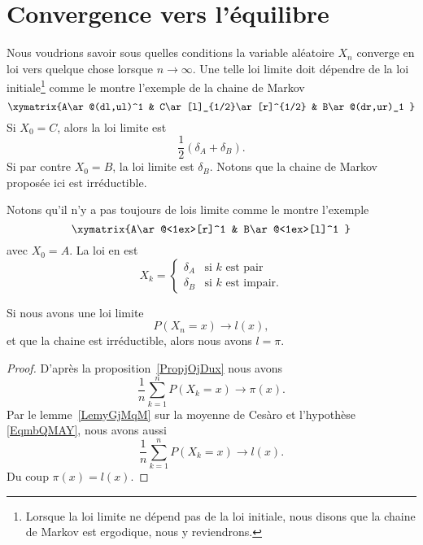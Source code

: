 \section{Convergence vers l'équilibre}

Nous voudrions savoir sous quelles conditions la variable aléatoire \( X_n\) converge en loi vers quelque chose lorsque \( n\to \infty\). Une telle loi limite doit dépendre de la loi initiale\footnote{Lorsque la loi limite ne dépend pas de la loi initiale, nous disons que la chaine de Markov est ergodique, nous y reviendrons.} comme le montre l'exemple de la chaine de Markov
\begin{equation}
	\xymatrix{%
		A\ar@(dl,ul)^1  & C\ar[l]_{1/2}\ar[r]^{1/2} &  B\ar@(dr,ur)_1
	}
\end{equation}
Si \( X_0=C\), alors la loi limite est
\begin{equation}
	\frac{ 1 }{2}(\delta_A+\delta_B).
\end{equation}
Si par contre \( X_0=B\), la loi limite est \(\delta_B\). Notons que la chaine de Markov proposée ici est irréductible.

Notons qu'il n'y a pas toujours de lois limite comme le montre l'exemple
\begin{equation}
	\xymatrix{%
		A\ar@<1ex>[r]^1  & B\ar@<1ex>[l]^1
	}
\end{equation}
avec \( X_0=A\). La loi en est
\begin{equation}
	X_k=\begin{cases}
		\delta_A & \text{si } k\text{ est pair}    \\
		\delta_B & \text{si } k\text{ est impair}.
	\end{cases}
\end{equation}

\begin{lemma}
	Si nous avons une loi limite
	\begin{equation}    \label{EqmbQMAY}
		P(X_n=x)\to l(x),
	\end{equation}
	et que la chaine est irréductible, alors nous avons \( l=\pi\).
\end{lemma}

\begin{proof}
	D'après la proposition~\ref{PropjOjDux} nous avons
	\begin{equation}
		\frac{1}{ n }\sum_{k=1}^nP(X_k=x)\to \pi(x).
	\end{equation}
	Par le lemme~\ref{LemyGjMqM} sur la moyenne de Cesàro et l'hypothèse \eqref{EqmbQMAY}, nous avons aussi
	\begin{equation}
		\frac{1}{ n }\sum_{k=1}^nP(X_k=x)\to l(x).
	\end{equation}
	Du coup \( \pi(x)=l(x)\).
\end{proof}

